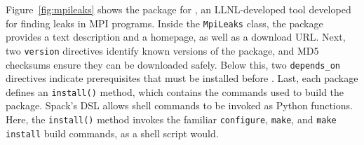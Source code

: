Figure~\ref{fig:mpileaks} shows the package for \mpileaks, an LLNL-developed
tool developed for finding leaks in MPI programs.
Inside the {\tt MpiLeaks} class, the package provides a text description
and a homepage, as well as 
a download URL.  Next, two {\tt version} directives identify known versions
of the package, and MD5 checksums ensure they can be downloaded safely.
Below this, two {\tt depends\_on}
directives indicate prerequisites that must be installed before \mpileaks.
Last, each package defines an {\tt install()} method, which contains the
commands used to build the package.  Spack's DSL allows shell
commands to be invoked as Python functions. Here, the {\tt install()} 
method invokes the familiar {\tt configure}, {\tt make}, and
{\tt make install} build commands, as a shell script would.





